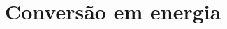 \documentclass[
	12pt,				%
	openright,			%
	oneside,			%
	a4paper,			%
	english,			%
	french,				%
	spanish,			%
	brazil				%
	]{abntex2}
\begin{document}
\chapter{Conversão em energia}

%
%
%
%
%
%
\end{document}
